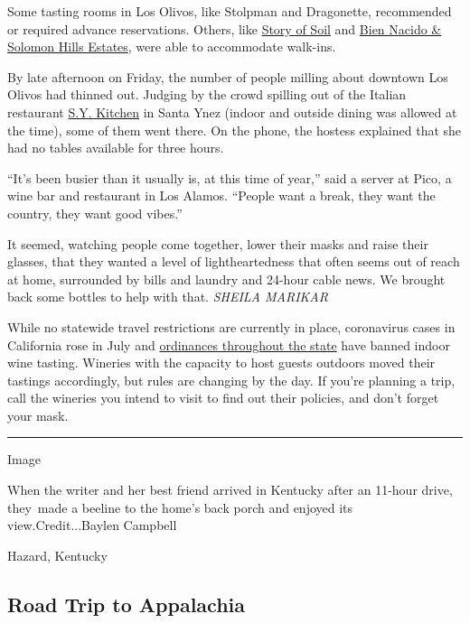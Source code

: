 Some tasting rooms in Los Olivos, like Stolpman and Dragonette,
recommended or required advance reservations. Others, like
\href{http://storyofsoilwine.com/}{Story of Soil} and
\href{https://biennacidoestate.com/}{Bien Nacido \& Solomon Hills
Estates}, were able to accommodate walk-ins.

By late afternoon on Friday, the number of people milling about downtown
Los Olivos had thinned out. Judging by the crowd spilling out of the
Italian restaurant \href{https://www.sykitchen.com/}{S.Y. Kitchen} in
Santa Ynez (indoor and outside dining was allowed at the time), some of
them went there. On the phone, the hostess explained that she had no
tables available for three hours.

``It's been busier than it usually is, at this time of year,'' said a
server at Pico, a wine bar and restaurant in Los Alamos. ``People want a
break, they want the country, they want good vibes.''

It seemed, watching people come together, lower their masks and raise
their glasses, that they wanted a level of lightheartedness that often
seems out of reach at home, surrounded by bills and laundry and 24-hour
cable news. We brought back some bottles to help with that. \emph{SHEILA
MARIKAR}

While no statewide travel restrictions are currently in place,
coronavirus cases in California rose in July and
\href{https://www.nytimes3xbfgragh.onion/interactive/2020/us/california-coronavirus-cases.html}{ordinances
throughout the state} have banned indoor wine tasting. Wineries with the
capacity to host guests outdoors moved their tastings accordingly, but
rules are changing by the day. If you're planning a trip, call the
wineries you intend to visit to find out their policies, and don't
forget your mask.

\begin{center}\rule{0.5\linewidth}{\linethickness}\end{center}

Image

When the writer and her best friend arrived in Kentucky after an 11-hour
drive, they~made a beeline to the home's back porch and enjoyed its
view.Credit...Baylen Campbell

Hazard, Kentucky

\hypertarget{road-trip-to-appalachia}{%
\subsection{Road Trip to Appalachia}\label{road-trip-to-appalachia}}

